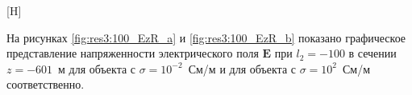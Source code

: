 \documentclass[a4paper,14pt]{article}
\makeatletter
\renewenvironment{figure}[1][\fps@figure]{
  \edef\@tempa{\noexpand\@float{figure}[#1]}
  \@tempa
  \addtocounter{foofigure}{1}
}{
  \end@float
}
\renewcommand{\Re}{\mathop{\mathrm{Re}}\nolimits}
\makeatother
\begin{document}
\begin{figure}[H]
	\centering
	\text{~~}
	\caption{векторы $(\Re(\mathbf{E}_x), \Re{\mathbf{E}_z})^T$, изолинии $\Re(\mathbf{E}_y)$ при $l_2=-100$}
	\label{fig:res3:100_vec}
\end{figure}

На рисунках \ref{fig:res3:100_EzR_a} и \ref{fig:res3:100_EzR_b} показано графическое представление напряженности электрического поля $\mathbf{E}$ при $l_2=-100$ в сечении $z=-601$~м для объекта с $\sigma=10^{-2}$~См/м и для объекта с $\sigma=10^{2}$~См/м соответственно.
\end{document}
